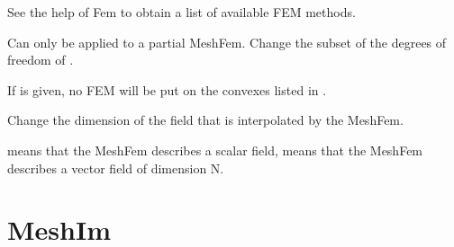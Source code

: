 \documentclass[a4paper,11pt,english]{sphinxmanual}
\begin{document}
\begin{fulllineitems}
\begin{fulllineitems}
See the help of Fem to obtain a list of available FEM methods.

\end{fulllineitems}


\begin{fulllineitems}
\label{\detokenize{python/cmdref_MeshFem:getfem.MeshFem.set_partial}}
Can only be applied to a partial MeshFem. Change the subset of the
degrees of freedom of .

If  is given, no FEM will be put on the convexes listed
in .

\end{fulllineitems}


\begin{fulllineitems}
\label{\detokenize{python/cmdref_MeshFem:getfem.MeshFem.set_qdim}}
Change the  dimension of the field that is interpolated by the MeshFem.

 means that the MeshFem describes a scalar field,  means
that the MeshFem describes a vector field of dimension N.

\end{fulllineitems}


\end{fulllineitems}



\section{MeshIm}
\label{\detokenize{python/cmdref_MeshIm:meshim}}\label{\detokenize{python/cmdref_MeshIm::doc}}
\end{document}

